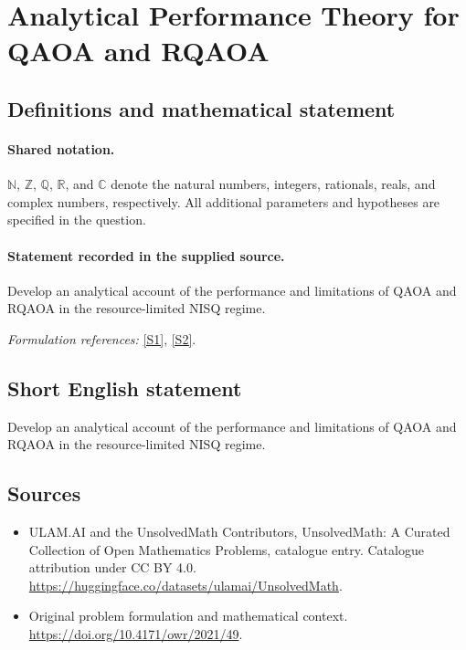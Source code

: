 \documentclass[11pt]{article}
\newcommand{\sref}[2]{\hyperlink{source:#1:#2}{[S#2]}}
\begin{document}
\section{Analytical Performance Theory for QAOA and RQAOA}\label{statement}

\subsection{Definitions and mathematical statement}

\paragraph{Shared notation.}$\mathbb N$, $\mathbb Z$, $\mathbb Q$, $\mathbb R$, and $\mathbb C$ denote the natural numbers, integers, rationals, reals, and complex numbers, respectively. All additional parameters and hypotheses are specified in the question.


\paragraph{Statement recorded in the supplied source.}
Develop an analytical account of the performance and limitations of QAOA and RQAOA in the resource-limited NISQ regime.
\par\smallskip\textit{Formulation references:} \sref{statement}{1}, \sref{statement}{2}.
\subsection{Short English statement}
Develop an analytical account of the performance and limitations of QAOA and RQAOA in the resource-limited NISQ regime.
\subsection{Sources}
\begin{itemize}
\item[\hypertarget{source:statement:1}{S1}] ULAM.AI and the UnsolvedMath Contributors, UnsolvedMath: A Curated Collection of Open Mathematics Problems, catalogue entry. Catalogue attribution under CC BY 4.0.
\url{https://huggingface.co/datasets/ulamai/UnsolvedMath}.
\item[\hypertarget{source:statement:2}{S2}] Original problem formulation and mathematical context.
\url{https://doi.org/10.4171/owr/2021/49}.
\end{itemize}
\label{end:statement}
\end{document}
